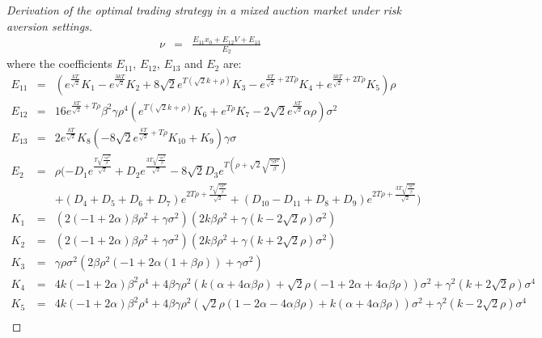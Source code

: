 \begin{proof}[Derivation of the optimal trading strategy in a mixed auction market under risk aversion settings]
  \begin{eqnarray*}
    \nu &=& \frac{E_{11}x_0 + E_{12} V + E_{13}}{E_2}
  \end{eqnarray*}
  where the coefficients $E_{11}$, $E_{12}$, $E_{13}$ and $E_{2}$ are:
  \begin{eqnarray*}
    E_{11} &=& \left(e^{\frac{k T}{\sqrt{2}}} K_1-e^{\frac{3 k T}{\sqrt{2}}} K_2+8 \sqrt{2} e^{T \left(\sqrt{2} k+\rho \right)} K_3-e^{\frac{k
        T}{\sqrt{2}}+2 T \rho } K_4+e^{\frac{3 k T}{\sqrt{2}}+2 T \rho } K_5\right) \rho\\
    E_{12} &=& 16 e^{\frac{k T}{\sqrt{2}}+T \rho } \beta ^2 \gamma  \rho ^4 \left(e^{T \left(\sqrt{2} k+\rho \right)} K_6+e^{T \rho } K_7-2 \sqrt{2}
    e^{\frac{k T}{\sqrt{2}}} \alpha  \rho \right) \sigma ^2\\
    E_{13} &=& 2 e^{\frac{k T}{\sqrt{2}}} K_{8} \left(-8 \sqrt{2} e^{\frac{k T}{\sqrt{2}}+T \rho } K_{10}+K_{9}\right) \gamma  \sigma\\
    E_{2} &=& \rho (-D_1 e^{\frac{T \sqrt{\frac{\gamma  \sigma ^2}{\beta }}}{\sqrt{2}}}+D_2 e^{\frac{3 T \sqrt{\frac{\gamma  \sigma ^2}{\beta }}}{\sqrt{2}}}-8
    \sqrt{2} D_3 e^{T \left(\rho +\sqrt{2} \sqrt{\frac{\gamma  \sigma ^2}{\beta }}\right)}\\
    &\ & + (D_4+D_5+D_6+D_7) e^{2 T \rho
        +\frac{T \sqrt{\frac{\gamma  \sigma ^2}{\beta }}}{\sqrt{2}}}+(D_{10}-D_{11}+D_8+D_9) e^{2 T \rho +\frac{3 T \sqrt{\frac{\gamma
              \sigma ^2}{\beta }}}{\sqrt{2}}})\\
    K_1 &=& \left(2 (-1+2 \alpha ) \beta  \rho ^2+\gamma  \sigma ^2\right) \left(2 k \beta  \rho ^2+\gamma  \left(k-2 \sqrt{2} \rho \right) \sigma ^2\right)\\
    K_2 &=& \left(2 (-1+2 \alpha ) \beta  \rho ^2+\gamma  \sigma ^2\right) \left(2 k \beta  \rho ^2+\gamma  \left(k+2 \sqrt{2} \rho \right) \sigma ^2\right)\\
    K_3 &=& \gamma  \rho  \sigma ^2 \left(2 \beta  \rho ^2 (-1+2 \alpha  (1+\beta  \rho ))+\gamma  \sigma ^2\right)\\
    K_4 &=& 4 k (-1+2 \alpha ) \beta ^2 \rho ^4+4 \beta  \gamma  \rho ^2 \left(k (\alpha +4 \alpha  \beta  \rho )+\sqrt{2} \rho  (-1+2 \alpha +4 \alpha  \beta
    \rho )\right) \sigma ^2+\gamma ^2 \left(k+2 \sqrt{2} \rho \right) \sigma ^4\\
    K_5 &=& 4 k (-1+2 \alpha ) \beta ^2 \rho ^4+4 \beta  \gamma  \rho ^2 \left(\sqrt{2} \rho  (1-2 \alpha -4 \alpha  \beta  \rho )+k (\alpha +4 \alpha  \beta
    \rho )\right) \sigma ^2+\gamma ^2 \left(k-2 \sqrt{2} \rho \right) \sigma ^4\\

\end{eqnarray*}
\end{proof}
